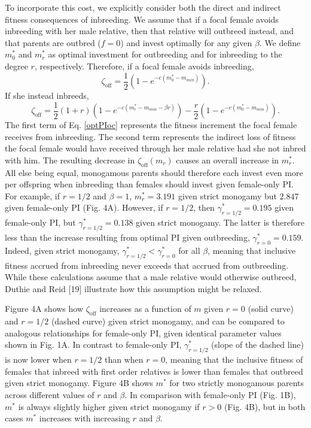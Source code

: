 \documentclass[12pt]{article}
\begin{document}
To incorporate this cost, we explicitly consider both the direct and indirect fitness consequences of inbreeding. We assume that if a focal female avoids inbreeding with her male relative, then that relative will outbreed instead, and that parents are outbred ($f=0$) and invest optimally for any given $\beta$. We define $m^{*}_{0}$ and $m^{*}_{r}$ as optimal investment for outbreeding and for inbreeding to the degree $r$, respectively. Therefore, if a focal female avoids inbreeding,
\begin{equation} \label{optPI}
\zeta_{\textrm{off}} = \frac{1}{2}\left(1-e^{-c\left(m^{*}_{0}-m_{min}\right)}\right).
\end{equation}
If she instead inbreeds,
\begin{equation} \label{optPIoc}
\zeta_{\textrm{off}} = \frac{1}{2}\left(1+r\right)\left(1-e^{-c\left(m^{*}_{r}-m_{min}-\beta r\right)}\right) - \frac{r}{2}\left(1-e^{-c\left(m^{*}_{0}-m_{min}\right)}\right).
\end{equation} 
The first term of Eq. \ref{optPIoc} represents the fitness increment the focal female receives from inbreeding. The second term represents the indirect loss of fitness the focal female would have received through her male relative had she not inbred with him. The resulting decrease in $\zeta_{\textrm{off}}(m_{r})$ causes an overall increase in $m^{*}_{r}$. All else being equal, monogamous parents should therefore each invest even more per offspring when inbreeding than females should invest given female-only PI. For example, if $r=1/2$ and $\beta=1$, $m^{*}_{r}= 3.191$ given strict monogamy but $2.847$ given female-only PI (Fig. 4A). However, if $r=1/2$, then $\gamma^{*}_{r=1/2}=0.195$ given female-only PI, but $\gamma^{*}_{r=1/2}=0.138$ given strict monogamy. The latter is therefore less than the increase resulting from optimal PI given outbreeding, $\gamma^{*}_{r=0}=0.159$. Indeed, given strict monogamy, $\gamma^{*}_{r=1/2} < \gamma^{*}_{r=0}$ for all $\beta$, meaning that inclusive fitness accrued from inbreeding never exceeds that accrued from outbreeding.  While these calculations assume that a male relative would otherwise outbreed, Duthie and Reid [19] illustrate how this assumption might be relaxed.

Figure 4A shows how $\zeta_{\textrm{off}}$ increases as a function of $m$ given $r=0$ (solid curve) and $r=1/2$ (dashed curve) given strict monogamy, and can be compared to analogous relationships for female-only PI, given identical parameter values shown in Fig. 1A. In contrast to female-only PI, $\gamma^{*}_{r=1/2}$ (slope of the dashed line) is now lower when $r=1/2$ than when $r=0$, meaning that the inclusive fitness of females that inbreed with first order relatives is lower than females that outbreed given strict monogamy. Figure 4B shows $m^{*}$ for two strictly monogamous parents across different values of $r$ and $\beta$. In comparison with female-only PI (Fig. 1B), $m^{*}$ is always slightly higher given strict monogamy if $r>0$ (Fig. 4B), but in both cases $m^{*}$ increases with increasing $r$ and $\beta$. 
\end{document}
